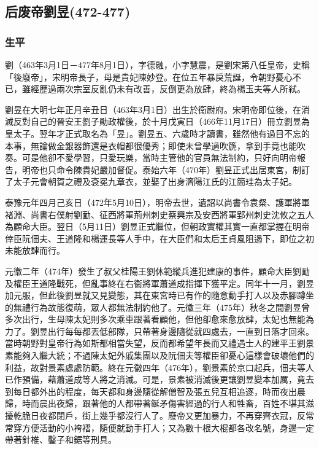 
\subsection{后废帝劉昱\tiny(472-477)}

\subsubsection{生平}

劉（463年3月1日－477年8月1日），字德融，小字慧震，是劉宋第八任皇帝，史稱「後廢帝」，宋明帝長子，母是貴妃陳妙登。在位五年暴戾荒誕，令朝野憂心不已，雖經歷過兩次宗室反亂仍未有改善，反倒更為放肆，終為楊玉夫等人所弒。

劉昱在大明七年正月辛丑日（463年3月1日）出生於衞尉府。宋明帝即位後，在消滅反對自己的晉安王劉子勛政權後，於十月戊寅日（466年11月17日）冊立劉昱為皇太子。翌年才正式取名為「昱」。劉昱五、六歲時才讀書，雖然他有過目不忘的本事，無論做金銀器飾還是衣帽都很優秀；即使未曾學過吹篪，拿到手竟也能吹奏。可是他卻不愛學習，只愛玩樂，當時主管他的官員無法制約，只好向明帝報告，明帝也只命令陳貴妃嚴加督促。泰始六年（470年）劉昱正式出居東宮，制訂了太子元會朝賀之禮及袞冕九章衣，並娶了出身濟陽江氏的江簡珪為太子妃。

泰豫元年四月己亥日（472年5月10日），明帝去世，遺詔以尚書令袁粲、護軍將軍褚淵、尚書右僕射劉勔、征西將軍荊州刺史蔡興宗及安西將軍郢州刺史沈攸之五人為顧命大臣。翌日（5月11日）劉昱正式繼位，但朝政實權其實一直都掌握在明帝倖臣阮佃夫、王道隆和楊運長等人手中，在大臣們和太后王貞風阻遏下，即位之初未能放肆而行。

元徽二年（474年）發生了叔父桂陽王劉休範縱兵進犯建康的事件，顧命大臣劉勔及權臣王道隆戰死，但亂事終在右衞將軍蕭道成指揮下獲平定。同年十一月，劉昱加元服，但此後劉昱就又見變態，其在東宮時已有作的隨意動手打人以及赤腳蹲坐的無禮行為故態復萌，眾人都無法制約他了。元徽三年（475年）秋冬之間劉昱曾多次出行，生母陳太妃則多次乘車跟著看顧他，但他卻愈來愈放肆，太妃也無能為力了。劉昱出行每每都丟低部隊，只帶著身邊隨從就四處去，一直到日落才回來。當時朝野對皇帝行為如斯都相當失望，反而都希望年長而又禮遇士人的建平王劉景素能夠入繼大統；不過陳太妃外戚集團以及阮佃夫等權臣卻憂心這樣會破壞他們的利益，故對景素處處防範。終在元徽四年（476年），劉景素於京口起兵，佃夫等人已作預備，藉蕭道成等人將之消滅。可是，景素被消滅後更讓劉昱變本加厲，竟去到每日都外出的程度，每天都和身邊隨從解僧智及張五兒互相追逐，時而夜出晨歸，時而晨出夜歸，跟著他的人都帶著鋋矛傷害經過的行人和牲畜，百姓不堪其滋擾乾脆日夜都閉戶，街上幾乎都沒行人了。廢帝又更加暴力，不再穿齊衣冠，反常常穿方便活動的小袴褶，隨便就動手打人；又為數十根大棍都各改名號，身邊一定帶著針椎、鑿子和鋸等刑具。

